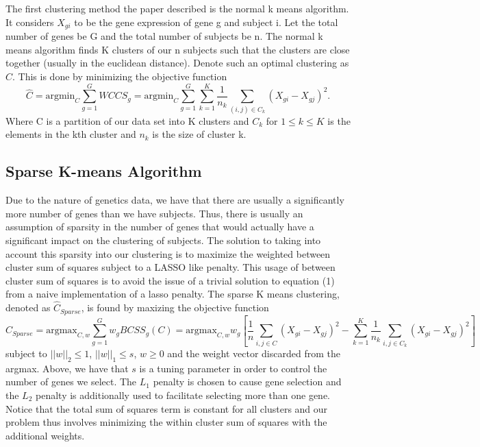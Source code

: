 \documentclass{statsoc}
\begin{document}
The first clustering method the paper described is the normal k means algorithm. It considers $X_{gi}$ to be the gene expression of gene g and subject i. Let the total number of genes be G and the total number of subjects be n. The normal k means algorithm finds K clusters of our n subjects such that the clusters are close together (usually in the euclidean distance). Denote such an optimal clustering as $\hat{C}$. This is done by minimizing the objective function 
\begin{equation}
    \hat{C} = \textrm{argmin}_C \sum_{g=1}^G WCCS_g = \textrm{argmin}_C \sum_{g=1}^G \sum_{k = 1}^K \frac{1}{n_k} \sum_{(i,j) \in C_k} (X_{gi} - X_{gj})^2. 
\end{equation}
Where C is a partition of our data set into K clusters and $C_k$ for $1\leq k \leq K$ is the elements in the kth cluster and $n_k$ is the size of cluster k.

\subsection{Sparse K-means Algorithm}

Due to the nature of genetics data, we have that there are usually a significantly more number of genes than we have subjects. Thus, there is usually an assumption of sparsity in the number of genes that would actually have a significant impact on the clustering of subjects. The solution to taking into account this sparsity into our clustering is to maximize the weighted between cluster sum of squares subject to a LASSO like penalty. This usage of between cluster sum of squares is to avoid the issue of a trivial solution to equation (1) from a naive implementation of a lasso penalty. The sparse K means clustering, denoted as $\hat{C}_{Sparse}$, is found by maxizing the objective function 
\begin{equation}
    \hat{C}_{Sparse} = \textrm{argmax}_{C,w} \sum_{g=1}^G w_g BCSS_g(C) = \textrm{argmax}_{C,w} w_g\left[\frac{1}{n} \sum_{i,j \in C} (X_{gi} - X_{gj})^2 - \sum_{k=1}^K \frac{1}{n_k}\sum_{i,j \in C_k} (X_{gi} - X_{gj})^2 \right]
\end{equation}
subject to $||w||_2 \leq 1$, $||w||_1 \leq s$, $w \geq 0$ and the weight vector discarded from the argmax. Above, we have that $s$ is a tuning parameter in order to control the number of genes we select. The $L_1$ penalty is chosen to cause gene selection and the $L_2$ penalty is additionally used to facilitate selecting more than one gene. Notice that the total sum of squares term is constant for all clusters and our problem thus involves minimizing the within cluster sum of squares with the additional weights.
    
\end{document}
